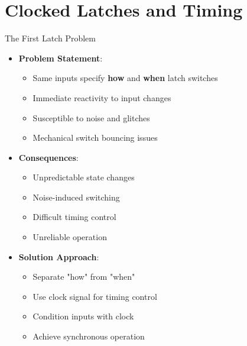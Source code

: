 \documentclass[aspectratio=169,11pt]{beamer}
\newcommand{\concept}[1]{\textbf{\color{accentcolor}#1}}
\begin{document}
\section{Clocked Latches and Timing}

\begin{frame}{The First Latch Problem}
\begin{itemize}
\item \concept{Problem Statement}: 
\begin{itemize}
\item Same inputs specify \textbf{how} and \textbf{when} latch switches
\item Immediate reactivity to input changes
\item Susceptible to noise and glitches
\item Mechanical switch bouncing issues
\end{itemize}
\vspace{0.5cm}
\item \concept{Consequences}:
\begin{itemize}
\item Unpredictable state changes
\item Noise-induced switching
\item Difficult timing control
\item Unreliable operation
\end{itemize}
\vspace{0.5cm}
\item \concept{Solution Approach}:
\begin{itemize}
\item Separate "how" from "when"
\item Use clock signal for timing control
\item Condition inputs with clock
\item Achieve synchronous operation
\end{itemize}
\end{itemize}
\end{frame}
\end{document}
